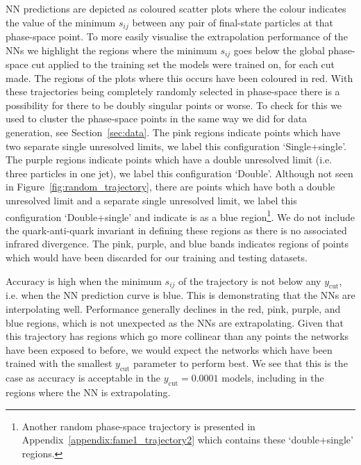 \documentclass[main.tex]{subfiles}
\begin{document}
NN predictions are depicted as coloured scatter plots where the colour indicates the value of the minimum $s_{ij}$ between any pair of final-state particles at that phase-space point.
To more easily visualise the extrapolation performance of the NNs we highlight the regions where the minimum $s_{ij}$ goes below the global phase-space cut applied to the training set the models were trained on, 
for each cut made. The regions of the plots where this occurs have been coloured in red.  
With these trajectories being completely randomly selected in phase-space there is a possibility for there to be doubly singular points or worse.
To check for this we used {\FastJet} to cluster the phase-space points in the same way we did for data generation, see Section~\ref{sec:data}.
The pink regions indicate points which have two separate single unresolved limits, we label this configuration `Single+single'.
The purple regions indicate points which have a double unresolved limit (i.e. three particles in one jet), we label this configuration `Double'.
Although not seen in Figure~\ref{fig:random_trajectory}, there are points which have both a double unresolved limit and a separate single unresolved limit,
we label this configuration `Double+single' and indicate is as a blue region\footnote{Another random phase-space trajectory is presented in Appendix~\ref{appendix:fame1_trajectory2} which contains these `double+single' regions.}.
We do not include the quark-anti-quark invariant in defining these regions as there is no associated infrared divergence.
The pink, purple, and blue bands indicates regions of points which would have been discarded for our training and testing datasets.

Accuracy is high when the minimum $s_{ij}$ of the trajectory is not below any $y_{\mathrm{cut}}$, i.e. when the NN prediction curve is blue.
This is demonstrating that the NNs are interpolating well.
Performance generally declines in the red, pink, purple, and blue regions, which is not unexpected as the NNs are extrapolating.
Given that this trajectory has regions which go more collinear than any points the networks have been exposed to before, we would expect the networks which
have been trained with the smallest $y_{\mathrm{cut}}$ parameter to perform best.
We see that this is the case as accuracy is acceptable in the $y_{\mathrm{cut}} = 0.0001$ models, including in the regions where the NN is extrapolating.
\end{document}
